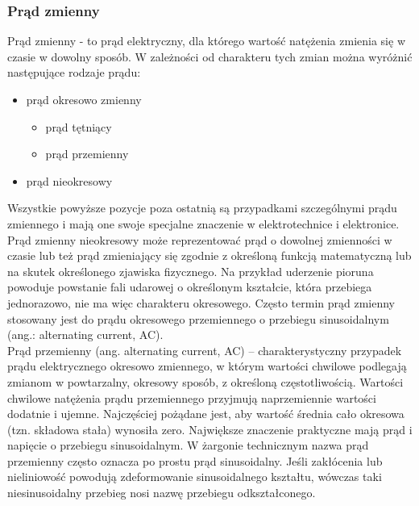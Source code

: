 \documentclass[12pt]{article}
\begin{document}
\subsubsection{Prąd zmienny}
Prąd zmienny - to prąd elektryczny, dla którego wartość natężenia zmienia się w czasie w dowolny sposób. W zależności od charakteru tych zmian można wyróżnić następujące rodzaje prądu:
\begin{itemize}
    \item prąd okresowo zmienny
    \begin{itemize}
        \item prąd tętniący
        \item prąd przemienny
    \end{itemize}
    \item prąd nieokresowy
\end{itemize}
Wszystkie powyższe pozycje poza ostatnią są przypadkami szczególnymi prądu zmiennego i mają one swoje specjalne znaczenie w elektrotechnice i elektronice. Prąd zmienny nieokresowy może reprezentować prąd o dowolnej zmienności w czasie lub też prąd zmieniający się zgodnie z określoną funkcją matematyczną lub na skutek określonego zjawiska fizycznego. Na przykład uderzenie pioruna powoduje powstanie fali udarowej o określonym kształcie, która przebiega jednorazowo, nie ma więc charakteru okresowego. Często termin prąd zmienny stosowany jest do prądu okresowego przemiennego o przebiegu sinusoidalnym (ang.: alternating current, AC).\\
Prąd przemienny (ang. alternating current, AC) – charakterystyczny przypadek prądu elektrycznego okresowo zmiennego, w którym wartości chwilowe podlegają zmianom w powtarzalny, okresowy sposób, z określoną częstotliwością. Wartości chwilowe natężenia prądu przemiennego przyjmują naprzemiennie wartości dodatnie i ujemne. Najczęściej pożądane jest, aby wartość średnia cało okresowa (tzn. składowa stała) wynosiła zero. Największe znaczenie praktyczne mają prąd i napięcie o przebiegu sinusoidalnym. W żargonie technicznym nazwa prąd przemienny często oznacza po prostu prąd sinusoidalny. Jeśli zakłócenia lub nieliniowość powodują zdeformowanie sinusoidalnego kształtu, wówczas taki niesinusoidalny przebieg nosi nazwę przebiegu odkształconego.
\end{document}
